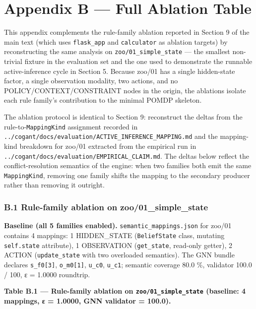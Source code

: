 \documentclass[
]{article}
\begin{document}
\section{Appendix B --- Full Ablation
Table}\label{appendix-b-full-ablation-table}

This appendix complements the rule-family ablation reported in Section 9
of the main text (which uses \texttt{flask\_app} and \texttt{calculator}
as ablation targets) by reconstructing the same analysis on
\texttt{zoo/01\_simple\_state} --- the smallest non-trivial fixture in
the evaluation set and the one used to demonstrate the runnable
active-inference cycle in Section 5. Because zoo/01 has a single
hidden-state factor, a single observation modality, two actions, and no
POLICY/CONTEXT/CONSTRAINT nodes in the origin, the ablations isolate
each rule family's contribution to the minimal POMDP skeleton.

The ablation protocol is identical to Section 9: reconstruct the deltas
from the rule-to-\texttt{MappingKind} assignment recorded in
\texttt{../cogant/docs/evaluation/ACTIVE\_INFERENCE\_MAPPING.md} and the
mapping-kind breakdown for zoo/01 extracted from the empirical run in
\texttt{../cogant/docs/evaluation/EMPIRICAL\_CLAIM.md}. The deltas below
reflect the conflict-resolution semantics of the engine: when two
families both emit the same \texttt{MappingKind}, removing one family
shifts the mapping to the secondary producer rather than removing it
outright.

\subsubsection{B.1 Rule-family ablation on
zoo/01\_simple\_state}\label{b.1-rule-family-ablation-on-zoo01_simple_state}

\textbf{Baseline (all 5 families enabled).}
\texttt{semantic\_mappings.json} for zoo/01 contains 4 mappings: 1
HIDDEN\_STATE (\texttt{BeliefState} class, mutating \texttt{self.state}
attribute), 1 OBSERVATION (\texttt{get\_state}, read-only getter), 2
ACTION (\texttt{update\_state} with two overloaded semantics). The GNN
bundle declares \texttt{s\_f0{[}3{]}}, \texttt{o\_m0{[}1{]}},
\texttt{u\_c0}, \texttt{u\_c1}; semantic coverage 80.0 \%, validator
100.0 / 100, ε = 1.0000 roundtrip.

\textbf{Table B.1 --- Rule-family ablation on
\texttt{zoo/01\_simple\_state} (baseline: 4 mappings, ε = 1.0000, GNN
validator = 100.0).}
\end{document}
